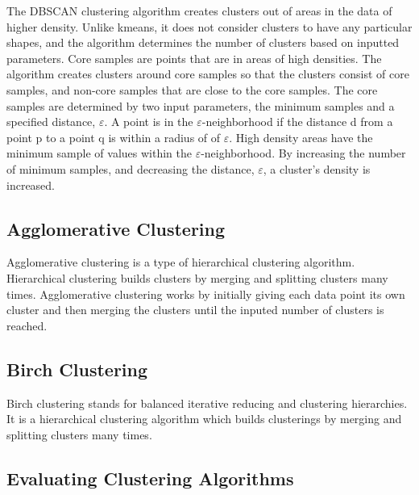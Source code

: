 \documentclass[colorlinks=true,pdfstartview=FitV,linkcolor=blue,
            citecolor=red,urlcolor=magenta]{ligodoc}
\begin{document}
\indent

\par The DBSCAN clustering algorithm creates clusters out of areas in the data of higher density. Unlike kmeans, it does not consider clusters to have any particular shapes, and the algorithm determines the number of clusters based on inputted parameters. Core samples are points that are in areas of high densities. The algorithm creates clusters around core samples so that the clusters consist of core samples, and non-core samples that are close to the core samples. The core samples are determined by two input parameters, the minimum samples and a specified distance, $\varepsilon$. A point is in the $\varepsilon$-neighborhood if the distance d from a point p to a point q is within a radius of of $\varepsilon$. High density areas have the minimum sample of values within the $\varepsilon$-neighborhood. By increasing the number of minimum samples, and decreasing the distance, $\varepsilon$, a cluster's density is increased. \cite{Citation2}\cite{Citation4}

\subsection{Agglomerative Clustering}

\indent

\par Agglomerative clustering is a type of hierarchical clustering algorithm. Hierarchical clustering builds clusters by merging and splitting clusters many times. Agglomerative clustering works by initially giving each data point its own cluster and then merging the clusters until the inputed number of clusters is reached. \cite{Citation2}

\subsection{Birch Clustering}

\indent

\par Birch clustering stands for balanced iterative reducing and clustering hierarchies. It is a hierarchical clustering algorithm which builds clusterings by merging and splitting clusters many times. \cite{Citation5}

\subsection{Evaluating Clustering Algorithms}
\end{document}
